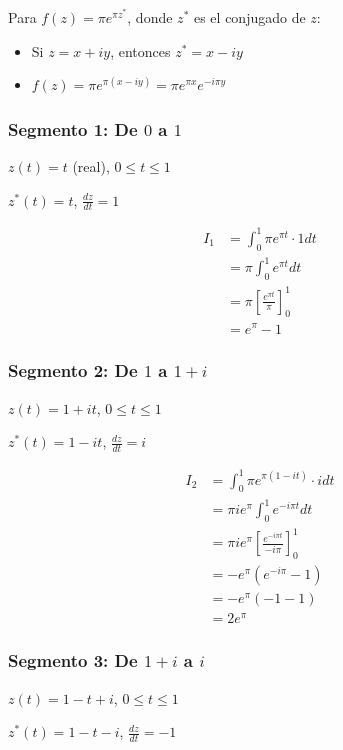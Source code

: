\documentclass{article}
\begin{document}
Para $f(z) = \pi e^{\pi z^*}$, donde $z^*$ es el conjugado de $z$:
\begin{itemize}
\item Si $z = x + iy$, entonces $z^* = x - iy$
\item $f(z) = \pi e^{\pi(x - iy)} = \pi e^{\pi x} e^{-i\pi y}$
\end{itemize}

\subsubsection*{Segmento 1: De $0$ a $1$}

$z(t) = t$ (real), $0 \leq t \leq 1$

$z^*(t) = t$, $\frac{dz}{dt} = 1$

\begin{align*}
I_1 &= \int_0^1 \pi e^{\pi t} \cdot 1 dt \\
    &= \pi \int_0^1 e^{\pi t} dt \\
    &= \pi \left[\frac{e^{\pi t}}{\pi}\right]_0^1 \\
    &= e^{\pi} - 1
\end{align*}

\subsubsection*{Segmento 2: De $1$ a $1 + i$}

$z(t) = 1 + it$, $0 \leq t \leq 1$

$z^*(t) = 1 - it$, $\frac{dz}{dt} = i$

\begin{align*}
I_2 &= \int_0^1 \pi e^{\pi(1 - it)} \cdot i dt \\
    &= \pi i e^{\pi} \int_0^1 e^{-i\pi t} dt \\
    &= \pi i e^{\pi} \left[\frac{e^{-i\pi t}}{-i\pi}\right]_0^1 \\
    &= -e^{\pi} (e^{-i\pi} - 1) \\
    &= -e^{\pi} (-1 - 1) \\
    &= 2e^{\pi}
\end{align*}

\subsubsection*{Segmento 3: De $1 + i$ a $i$}

$z(t) = 1 - t + i$, $0 \leq t \leq 1$

$z^*(t) = 1 - t - i$, $\frac{dz}{dt} = -1$
\end{document}
